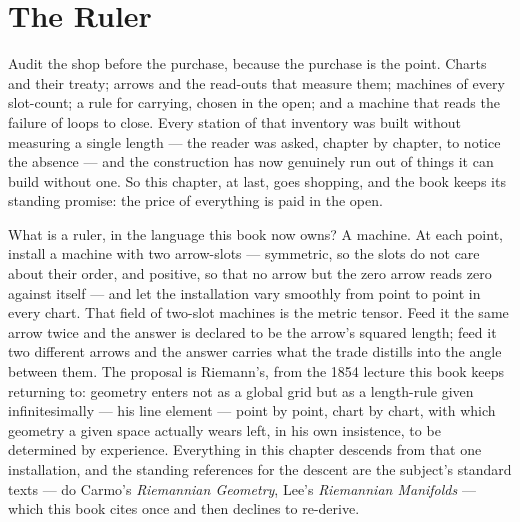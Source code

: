 \chapter{The Ruler}

Audit the shop before the purchase, because the purchase is the point.
Charts and their treaty; arrows and the read-outs that measure them;
machines of every slot-count; a rule for carrying, chosen in the open; and
a machine that reads the failure of loops to close. Every station of that
inventory was built without measuring a single length --- the reader was
asked, chapter by chapter, to notice the absence --- and the construction
has now genuinely run out of things it can build without one. So this
chapter, at last, goes shopping, and the book keeps its standing promise:
the price of everything is paid in the open.

What is a ruler, in the language this book now owns? A machine. At each
point, install a machine with two arrow-slots --- symmetric, so the slots
do not care about their order, and positive, so that no arrow but the zero
arrow reads zero against itself --- and let the installation vary smoothly
from point to point in every chart. That field of two-slot machines is the
metric tensor. Feed it the same arrow twice and the answer is declared to
be the arrow's squared length; feed it two different arrows and the answer
carries what the trade distills into the angle between them. The proposal
is Riemann's, from the 1854 lecture this book keeps returning to: geometry
enters not as a global grid but as a length-rule given infinitesimally ---
his line element --- point by point, chart by chart, with which geometry a
given space actually wears left, in his own insistence, to be determined
by experience. Everything in this chapter descends from that one
installation, and the standing references for the descent are the
subject's standard texts --- do Carmo's \emph{Riemannian Geometry}, Lee's
\emph{Riemannian Manifolds} --- which this book cites once and then
declines to re-derive.


